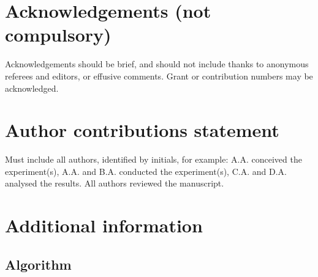 \documentclass[fleqn,10pt]{wlscirep}
\begin{document}
	\section*{Acknowledgements (not compulsory)}
	
	Acknowledgements should be brief, and should not include thanks to anonymous referees and editors, or effusive comments. Grant or contribution numbers may be acknowledged.
	
	\section*{Author contributions statement}
	
	Must include all authors, identified by initials, for example:
	A.A. conceived the experiment(s),  A.A. and B.A. conducted the experiment(s), C.A. and D.A. analysed the results.  All authors reviewed the manuscript. 
	
	\section*{Additional information}
	
	\subsection*{Algorithm}
	\label{algorithms}
	
\end{document}
